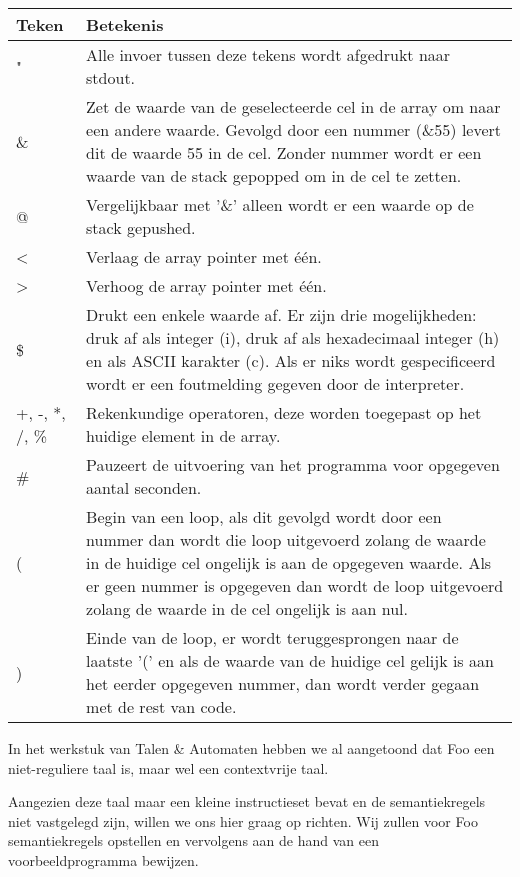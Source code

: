 \documentclass[11pt]{article}
\begin{document}
\begin{center}
    \begin{tabular}{ | l | p{15cm} |}
    \hline
    Teken & Betekenis \\ \hline
    " & Alle invoer tussen deze tekens wordt afgedrukt naar stdout. \\ \hline
    \& & Zet de waarde van de geselecteerde cel in de array om naar een andere waarde. Gevolgd door een nummer (\&55) levert dit de waarde 55 in de cel. Zonder nummer wordt er een waarde van de stack gepopped om in de cel te zetten. \\ \hline
    @ & Vergelijkbaar met '\&' alleen wordt er een waarde op de stack gepushed. \\ \hline
    < & Verlaag de array pointer met \'e\'en. \\ \hline
    > & Verhoog de array pointer met \'e\'en. \\ \hline
    \$ & Drukt een enkele waarde af. Er zijn drie mogelijkheden: druk af als integer (i), druk af als hexadecimaal integer (h) en als ASCII karakter (c). Als er niks wordt gespecificeerd wordt er een foutmelding gegeven door de interpreter. \\ \hline
    +, -, *, /, \% & Rekenkundige operatoren, deze worden toegepast op het huidige element in de array. \\ \hline
    \# & Pauzeert de uitvoering van het programma voor opgegeven aantal seconden. \\ \hline
    ( & Begin van een loop, als dit gevolgd wordt door een nummer dan wordt die loop uitgevoerd zolang de waarde in de huidige cel ongelijk is aan de opgegeven waarde. Als er geen nummer is opgegeven dan wordt de loop uitgevoerd zolang de waarde in de cel ongelijk is aan nul. \\ \hline
    ) & Einde van de loop, er wordt teruggesprongen naar de laatste '(' en als de waarde van de huidige cel gelijk is aan het eerder opgegeven nummer, dan wordt verder gegaan met de rest van code. \\ \hline
  

    \hline
    \end{tabular}
\end{center}

In het werkstuk van Talen \& Automaten hebben we al aangetoond dat Foo een niet-reguliere taal is, maar wel een contextvrije taal.

Aangezien deze taal maar een kleine instructieset bevat en de semantiekregels niet vastgelegd zijn, willen we ons hier graag op richten. Wij zullen voor Foo semantiekregels opstellen en vervolgens aan de hand van een voorbeeldprogramma bewijzen.
\end{document}
